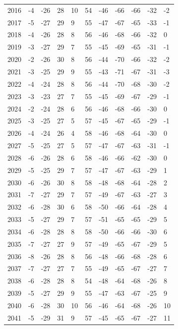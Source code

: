 \begin{table}[H]
\begin{tabular}{lllllllllll}
2016 & -4 & -26 & 28 & 10 & 54 & -46 & -66 & -66 & -32 & -2 \\
2017 & -5 & -27 & 29 & 9 & 55 & -47 & -67 & -65 & -33 & -1 \\
2018 & -4 & -26 & 28 & 8 & 56 & -46 & -68 & -66 & -32 & 0 \\
2019 & -3 & -27 & 29 & 7 & 55 & -45 & -69 & -65 & -31 & -1 \\
2020 & -2 & -26 & 30 & 8 & 56 & -44 & -70 & -66 & -32 & -2 \\
2021 & -3 & -25 & 29 & 9 & 55 & -43 & -71 & -67 & -31 & -3 \\
2022 & -4 & -24 & 28 & 8 & 56 & -44 & -70 & -68 & -30 & -2 \\
2023 & -3 & -23 & 27 & 7 & 55 & -45 & -69 & -67 & -29 & -1 \\
2024 & -2 & -24 & 28 & 6 & 56 & -46 & -68 & -66 & -30 & 0 \\
2025 & -3 & -25 & 27 & 5 & 57 & -45 & -67 & -65 & -29 & -1 \\
2026 & -4 & -24 & 26 & 4 & 58 & -46 & -68 & -64 & -30 & 0 \\
2027 & -5 & -25 & 27 & 5 & 57 & -47 & -67 & -63 & -31 & -1 \\
2028 & -6 & -26 & 28 & 6 & 58 & -46 & -66 & -62 & -30 & 0 \\
2029 & -5 & -25 & 29 & 7 & 57 & -47 & -67 & -63 & -29 & 1 \\
2030 & -6 & -26 & 30 & 8 & 58 & -48 & -68 & -64 & -28 & 2 \\
2031 & -7 & -27 & 29 & 7 & 57 & -49 & -67 & -63 & -27 & 3 \\
2032 & -6 & -28 & 30 & 6 & 58 & -50 & -66 & -64 & -28 & 4 \\
2033 & -5 & -27 & 29 & 7 & 57 & -51 & -65 & -65 & -29 & 5 \\
2034 & -6 & -28 & 28 & 8 & 58 & -50 & -66 & -66 & -30 & 6 \\
2035 & -7 & -27 & 27 & 9 & 57 & -49 & -65 & -67 & -29 & 5 \\
2036 & -8 & -26 & 28 & 8 & 56 & -48 & -66 & -68 & -28 & 6 \\
2037 & -7 & -27 & 27 & 7 & 55 & -49 & -65 & -67 & -27 & 7 \\
2038 & -6 & -28 & 28 & 8 & 54 & -48 & -64 & -68 & -26 & 8 \\
2039 & -5 & -27 & 29 & 9 & 55 & -47 & -63 & -67 & -25 & 9 \\
2040 & -6 & -28 & 30 & 10 & 56 & -46 & -64 & -68 & -26 & 10 \\
2041 & -5 & -29 & 31 & 9 & 57 & -45 & -65 & -67 & -27 & 11 \\

\end{tabular}
\end{table}
